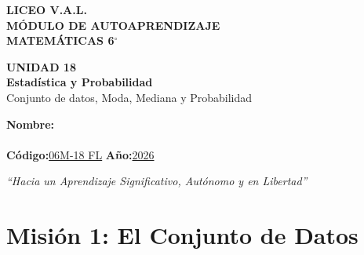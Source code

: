 \documentclass[12pt, letterpaper]{article}
\begin{document}
	
	\begin{center}
		{\Huge\textbf{LICEO V.A.L.}}\\[0.5cm]
		{\LARGE\textbf{MÓDULO DE AUTOAPRENDIZAJE}}\\[0.5cm]
		{\Large\textbf{MATEMÁTICAS 6$^\circ$}}\\[0.5cm]
		\begin{tcolorbox}[colback=valblue!10, colframe=valblue,
			arc=3mm, boxrule=1.5pt]
			\centering
			\Huge\textbf{UNIDAD 18}\\[0.2cm]
			\Large\textbf{Estadística y Probabilidad}\\[0.2cm]
			\large Conjunto de datos, Moda, Mediana y Probabilidad
		\end{tcolorbox}
		\vspace{0.6cm}
		\begin{tcolorbox}[colback=white, colframe=valblue,
			width=12cm, arc=3mm, boxrule=1.5pt]
			\centering\vspace{0.3cm}
			\textbf{Nombre:}\\[0.3cm]
			\underline{\hspace{9cm}}\\[0.5cm]
			\textbf{Código:}\;\underline{06M-18 FL}
			\hspace{1cm}\textbf{Año:}\;\underline{2026}
			\vspace{0.3cm}
		\end{tcolorbox}
		\vspace{0.8cm}
		\textit{``Hacia un Aprendizaje Significativo, Autónomo y en Libertad''}
	\end{center}
	\newpage
	\section*{Misión 1: El Conjunto de Datos}
	
\end{document}
